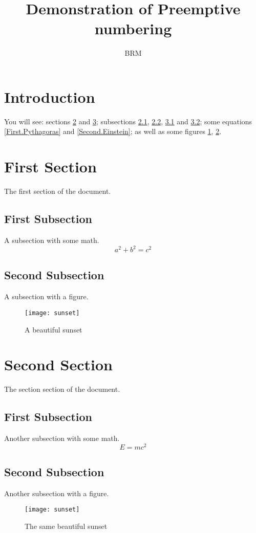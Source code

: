 \documentclass{article}
\title{Demonstration of Preemptive numbering}
\author{BRM}
\begin{document}
\maketitle
\section{Introduction}\label{Intro}
You will see: sections \ref{First} and \ref{Second};
subsections  \ref{First.First}, \ref{First.Second},
\ref{Second.First} and \ref{Second.Second};
some equations \ref{First.Pythagoras} and \ref{Second.Einstein};
as well as some figures \ref{First.Sunset},  \ref{Second.Sunset}.

\section{First Section}\label{First}
The first section of the document.
\subsection{First Subsection}\label{First.First}
A subsection with some math.
\begin{equation}\label{First.Pythagoras}
  a^2+b^2=c^2
\end{equation}
\subsection{Second Subsection}\label{First.Second}
A subsection with a figure.
\begin{figure}
  \texttt{[image: sunset]}
  \caption{A beautiful sunset\label{First.Sunset}}
\end{figure}
\section{Second Section}\label{Second}
The section section of the document.
\subsection{First Subsection}\label{Second.First}
Another subsection with some math.
\begin{equation}\label{Second.Einstein}
  E=mc^2
\end{equation}
\subsection{Second Subsection}\label{Second.Second}
Another subsection with a figure.
\begin{figure}
  \texttt{[image: sunset]}
  \caption{The same beautiful sunset\label{Second.Sunset}}
\end{figure}
\end{document}
